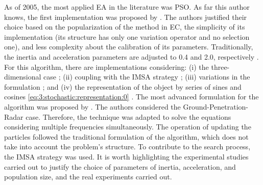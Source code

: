 			As of 2005, the most applied EA in the literature was PSO. As far this author knows, the first implementation was proposed by \cite{caorsi2004location}. The authors justified their choice based on the popularization of the method in EC, the simplicity of its implementation (its structure has only one variation operator and no selection one), and less complexity about the calibration of its parameters. Traditionally, the inertia and acceleration parameters are adjusted to 0.4 and 2.0, respectively \citep{rocca2009evolutionary}. For this algorithm, there are implementations considering: (i) the three-dimensional case \citep{donelli2009three}; (ii) coupling with the IMSA strategy \citep{donelli2006integrated}; (iii) variations in the formulation \citep{huang2007microparticle,yang2021quantum}; and (iv) the representation of the object by series of sines and cosines \eqref{eq:3:stochastic:representation:0} \citep{huang2008time}. The most advanced formulation for the algorithm was proposed by \cite{salucci2017multifrequency}. The authors considered the Ground-Penetration-Radar case. Therefore, the technique was adapted to solve the equations considering multiple frequencies simultaneously. The operation of updating the particles followed the traditional formulation of the algorithm, which does not take into account the problem's structure. To contribute to the search process, the IMSA strategy was used. It is worth highlighting the experimental studies carried out to justify the choice of parameters of inertia, acceleration, and population size, and the real experiments carried out.
			
